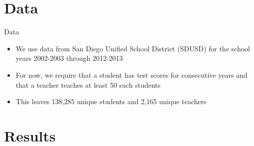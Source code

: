 \documentclass[11pt]{beamer}
\begin{document}
\section{Data}


\begin{frame}{Data}

    \begin{itemize}
        \item We use data from San Diego Unified School District (SDUSD) for the school years 2002-2003 through 2012-2013
        \item For now, we require that a student has test scores for consecutive years and that a teacher teaches at least 50 such students
        \item This leaves 138,285 unique students and 2,165 unique teachers
    \end{itemize}

\end{frame}










\section{Results}
\end{document}
